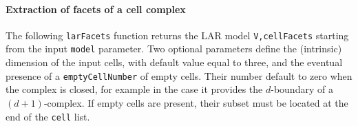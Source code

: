 \documentclass[11pt,oneside]{article}	%
\begin{document}
\paragraph{Extraction of facets of a cell complex} 

The following \texttt{larFacets} function returns the LAR model \texttt{V,cellFacets} starting from the input \texttt{model} parameter. Two optional parameters define the (intrinsic) dimension of the input cells, with default value equal to three, and the eventual presence of a \texttt{emptyCellNumber} of empty cells. Their number default to zero when the complex is closed, for example in the case it provides the $d$-boundary of a $(d+1)$-complex. If empty cells are present, their subset must be located at the end of the \texttt{cell} list.

\end{document}
